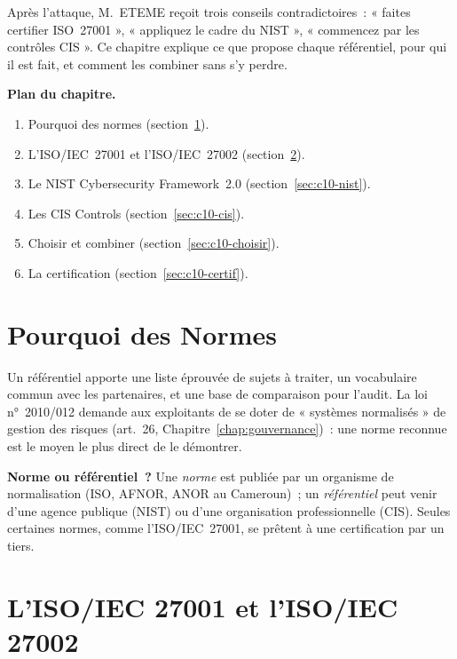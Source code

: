 Après l'attaque, M.~ETEME reçoit trois conseils contradictoires~: « faites
certifier ISO~27001 », « appliquez le cadre du NIST », « commencez par les
contrôles CIS ». Ce chapitre explique ce que propose chaque référentiel,
pour qui il est fait, et comment les combiner sans s'y perdre.

\medskip
\textbf{Plan du chapitre.}
\begin{enumerate}
    \item Pourquoi des normes (section~\ref{sec:c10-pourquoi}).
    \item L'ISO/IEC~27001 et l'ISO/IEC~27002 (section~\ref{sec:c10-iso}).
    \item Le NIST Cybersecurity Framework~2.0 (section~\ref{sec:c10-nist}).
    \item Les CIS Controls (section~\ref{sec:c10-cis}).
    \item Choisir et combiner (section~\ref{sec:c10-choisir}).
    \item La certification (section~\ref{sec:c10-certif}).
\end{enumerate}

\separateur

\section{Pourquoi des Normes}
\label{sec:c10-pourquoi}

Un référentiel apporte une liste éprouvée de sujets à traiter, un
vocabulaire commun avec les partenaires, et une base de comparaison pour
l'audit. La loi n°~2010/012 demande aux exploitants de se doter de
« systèmes normalisés » de gestion des risques (art.~26,
Chapitre~\ref{chap:gouvernance})~: une norme reconnue est le moyen le plus
direct de le démontrer.

\begin{boxinfo}
\textbf{Norme ou référentiel~?} Une \emph{norme} est publiée par un
organisme de normalisation (ISO, AFNOR, ANOR au Cameroun)~; un
\emph{référentiel} peut venir d'une agence publique (NIST) ou d'une
organisation professionnelle (CIS). Seules certaines normes, comme
l'ISO/IEC~27001, se prêtent à une certification par un tiers.
\end{boxinfo}

\section{L'ISO/IEC 27001 et l'ISO/IEC 27002}
\label{sec:c10-iso}

